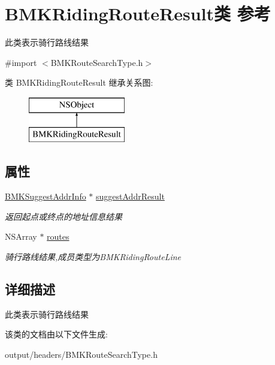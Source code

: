 \hypertarget{interface_b_m_k_riding_route_result}{}\section{B\+M\+K\+Riding\+Route\+Result类 参考}
\label{interface_b_m_k_riding_route_result}


此类表示骑行路线结果  




{\ttfamily \#import $<$B\+M\+K\+Route\+Search\+Type.\+h$>$}

类 B\+M\+K\+Riding\+Route\+Result 继承关系图\+:\begin{figure}[H]
\begin{center}
\leavevmode
\includegraphics[height=2.000000cm]{interface_b_m_k_riding_route_result}
\end{center}
\end{figure}
\subsection*{属性}
\begin{DoxyCompactItemize}
\item 
\hypertarget{interface_b_m_k_riding_route_result_a1e326a779869aefdfb79caadf257196e}{}\hyperlink{interface_b_m_k_suggest_addr_info}{B\+M\+K\+Suggest\+Addr\+Info} $\ast$ \hyperlink{interface_b_m_k_riding_route_result_a1e326a779869aefdfb79caadf257196e}{suggest\+Addr\+Result}\label{interface_b_m_k_riding_route_result_a1e326a779869aefdfb79caadf257196e}

\begin{DoxyCompactList}\small\item\em 返回起点或终点的地址信息结果 \end{DoxyCompactList}\item 
\hypertarget{interface_b_m_k_riding_route_result_ac65cf90b88cbaaddd5cbba7add886eb6}{}N\+S\+Array $\ast$ \hyperlink{interface_b_m_k_riding_route_result_ac65cf90b88cbaaddd5cbba7add886eb6}{routes}\label{interface_b_m_k_riding_route_result_ac65cf90b88cbaaddd5cbba7add886eb6}

\begin{DoxyCompactList}\small\item\em 骑行路线结果,成员类型为\+B\+M\+K\+Riding\+Route\+Line \end{DoxyCompactList}\end{DoxyCompactItemize}


\subsection{详细描述}
此类表示骑行路线结果 

该类的文档由以下文件生成\+:\begin{DoxyCompactItemize}
\item 
output/headers/B\+M\+K\+Route\+Search\+Type.\+h\end{DoxyCompactItemize}
